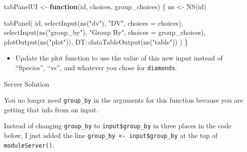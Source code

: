 \documentclass[
]{book}
\newenvironment{Shaded}{\begin{snugshade}}{\end{snugshade}}
\newcommand{\AttributeTok}[1]{\textcolor[rgb]{0.77,0.63,0.00}{#1}}
\newcommand{\CommentTok}[1]{\textcolor[rgb]{0.56,0.35,0.01}{\textit{#1}}}
\newcommand{\ControlFlowTok}[1]{\textcolor[rgb]{0.13,0.29,0.53}{\textbf{#1}}}
\newcommand{\FunctionTok}[1]{\textcolor[rgb]{0.00,0.00,0.00}{#1}}
\newcommand{\NormalTok}[1]{#1}
\newcommand{\OtherTok}[1]{\textcolor[rgb]{0.56,0.35,0.01}{#1}}
\newcommand{\SpecialCharTok}[1]{\textcolor[rgb]{0.00,0.00,0.00}{#1}}
\newcommand{\StringTok}[1]{\textcolor[rgb]{0.31,0.60,0.02}{#1}}
\providecommand{\tightlist}{%
  \setlength{\itemsep}{0pt}\setlength{\parskip}{0pt}}
\begin{document}
\begin{Shaded}
\begin{Highlighting}[]
\NormalTok{tabPanelUI }\OtherTok{\textless{}{-}} \ControlFlowTok{function}\NormalTok{(id, choices, group\_choices) \{}
\NormalTok{   ns }\OtherTok{\textless{}{-}} \FunctionTok{NS}\NormalTok{(id)}
   
   \FunctionTok{tabPanel}\NormalTok{(}
\NormalTok{       id,}
       \FunctionTok{selectInput}\NormalTok{(}\FunctionTok{ns}\NormalTok{(}\StringTok{"dv"}\NormalTok{), }\StringTok{"DV"}\NormalTok{, }\AttributeTok{choices =}\NormalTok{ choices),}
       \FunctionTok{selectInput}\NormalTok{(}\FunctionTok{ns}\NormalTok{(}\StringTok{"group\_by"}\NormalTok{), }\StringTok{"Group By"}\NormalTok{, }\AttributeTok{choices =}\NormalTok{ group\_choices),}
       \FunctionTok{plotOutput}\NormalTok{(}\FunctionTok{ns}\NormalTok{(}\StringTok{"plot"}\NormalTok{)),}
\NormalTok{       DT}\SpecialCharTok{::}\FunctionTok{dataTableOutput}\NormalTok{(}\FunctionTok{ns}\NormalTok{(}\StringTok{"table"}\NormalTok{))}
\NormalTok{   )}
\NormalTok{\}}
\end{Highlighting}
\end{Shaded}

\begin{itemize}
\tightlist
\item
  Update the plot function to use the value of this new input instead of ``Species'', ``vs'', and whatever you chose for \texttt{diamonds}.
\end{itemize}

Server Solution

You no longer need \texttt{group\_by} in the arguments for this function because you are getting that info from an input.

Instead of changing \texttt{group\_by} to \texttt{input\$group\_by} in three places in the code below, I just added the line \texttt{group\_by\ \textless{}-\ input\$group\_by} at the top of \texttt{moduleServer()}.

\begin{Shaded}
\end{Shaded}
\end{document}

